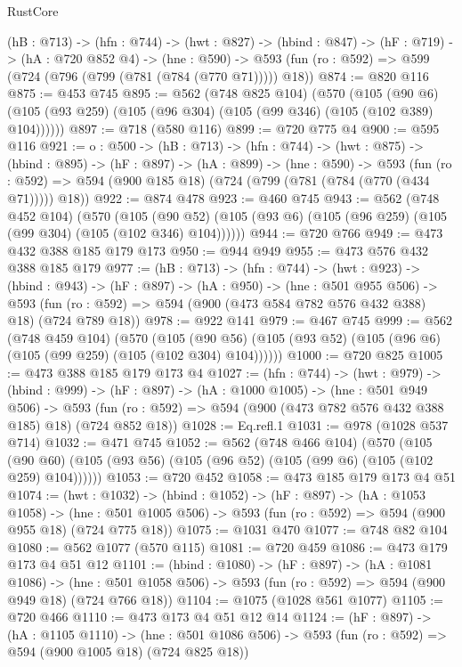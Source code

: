 \begin{lexlean}{RustCore}
\begin{coremodule}
  (hB : @713) ->
  (hfn : @744) ->
  (hwt : @827) ->
  (hbind : @847) ->
  (hF : @719) ->
  (hA : @720 @852 @4) ->
  (hne : @590) -> @593 (fun (ro : @592) => @599 (@724 (@796 (@799 (@781 (@784 (@770 @71))))) @18))
@874 := @820 @116
@875 := @453 @745
@895 := @562
    (@748 @825 @104)
    (@570
      (@105 (@90 @6) (@105 (@93 @259) (@105 (@96 @304) (@105 (@99 @346) (@105 (@102 @389) @104))))))
@897 := @718 (@580 @116)
@899 := @720 @775 @4
@900 := @595 @116
@921 := {o : @500} ->
  (hB : @713) ->
  (hfn : @744) ->
  (hwt : @875) ->
  (hbind : @895) ->
  (hF : @897) ->
  (hA : @899) ->
  (hne : @590) ->
  @593 (fun (ro : @592) => @594 (@900 @185 @18) (@724 (@799 (@781 (@784 (@770 (@434 @71))))) @18))
@922 := @874 @478
@923 := @460 @745
@943 := @562
    (@748 @452 @104)
    (@570
      (@105 (@90 @52) (@105 (@93 @6) (@105 (@96 @259) (@105 (@99 @304) (@105 (@102 @346) @104))))))
@944 := @720 @766
@949 := @473 @432 @388 @185 @179 @173
@950 := @944 @949
@955 := @473 @576 @432 @388 @185 @179
@977 := (hB : @713) ->
  (hfn : @744) ->
  (hwt : @923) ->
  (hbind : @943) ->
  (hF : @897) ->
  (hA : @950) ->
  (hne : @501 @955 @506) ->
  @593 (fun (ro : @592) => @594 (@900 (@473 @584 @782 @576 @432 @388) @18) (@724 @789 @18))
@978 := @922 @141
@979 := @467 @745
@999 := @562
    (@748 @459 @104)
    (@570
      (@105 (@90 @56) (@105 (@93 @52) (@105 (@96 @6) (@105 (@99 @259) (@105 (@102 @304) @104))))))
@1000 := @720 @825
@1005 := @473 @388 @185 @179 @173 @4
@1027 := (hfn : @744) ->
  (hwt : @979) ->
  (hbind : @999) ->
  (hF : @897) ->
  (hA : @1000 @1005) ->
  (hne : @501 @949 @506) ->
  @593 (fun (ro : @592) => @594 (@900 (@473 @782 @576 @432 @388 @185) @18) (@724 @852 @18))
@1028 := Eq.refl.{1}
@1031 := @978 (@1028 @537 @714)
@1032 := @471 @745
@1052 := @562
    (@748 @466 @104)
    (@570
      (@105 (@90 @60) (@105 (@93 @56) (@105 (@96 @52) (@105 (@99 @6) (@105 (@102 @259) @104))))))
@1053 := @720 @452
@1058 := @473 @185 @179 @173 @4 @51
@1074 := (hwt : @1032) ->
  (hbind : @1052) ->
  (hF : @897) ->
  (hA : @1053 @1058) ->
  (hne : @501 @1005 @506) -> @593 (fun (ro : @592) => @594 (@900 @955 @18) (@724 @775 @18))
@1075 := @1031 @470
@1077 := @748 @82 @104
@1080 := @562 @1077 (@570 @115)
@1081 := @720 @459
@1086 := @473 @179 @173 @4 @51 @12
@1101 := (hbind : @1080) ->
  (hF : @897) ->
  (hA : @1081 @1086) ->
  (hne : @501 @1058 @506) -> @593 (fun (ro : @592) => @594 (@900 @949 @18) (@724 @766 @18))
@1104 := @1075 (@1028 @561 @1077)
@1105 := @720 @466
@1110 := @473 @173 @4 @51 @12 @14
@1124 := (hF : @897) ->
  (hA : @1105 @1110) ->
  (hne : @501 @1086 @506) -> @593 (fun (ro : @592) => @594 (@900 @1005 @18) (@724 @825 @18))

\end{coremodule}
\end{lexlean}
